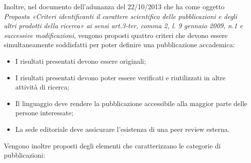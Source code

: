 Inoltre, nel documento dell’adunanza del 22/10/2013 che ha come oggetto \textit{Proposta «Criteri identificanti il carattere 
scientifico 
delle pubblicazioni e degli altri prodotti della ricerca» ai sensi art.3-ter, 
comma 2, l. 9 gennaio 2009, n.1 e successive modificazioni}, vengono proposti quattro criteri che devono essere simultaneamente 
soddisfatti per poter definire una pubblicazione accademica:

\begin{itemize}

    \item I risultati presentati devono essere originali;
    \item I risultati presentati devono poter essere verificati e riutilizzati in altre attività di ricerca;
    \item Il linguaggio deve rendere la pubblicazione accessibile alla maggior parte delle persone interessate;
    \item La sede editoriale deve assicurare l’esistenza di una peer review esterna.

\end{itemize}
Vengono inoltre proposti degli elementi che caratterizzano le categorie di pubblicazioni:

